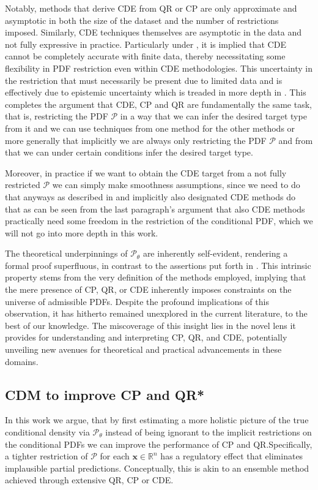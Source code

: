 Notably, methods that derive CDE from QR or CP are only approximate and asymptotic in both the size of the dataset and the number of restrictions imposed. Similarly, CDE techniques themselves are asymptotic in the data and not fully expressive in practice. Particularly under , it is implied that CDE cannot be completely accurate with finite data, thereby necessitating some flexibility in PDF restriction even within CDE methodologies. This uncertainty in the restriction that must necessarily be present due to limited data and  is effectively due to epistemic uncertainty which is treaded in more depth in . This completes the argument that CDE, CP and QR are fundamentally the same task, that is, restricting the PDF $\mathcal{P}$ in a way that we can infer the desired target type from it and we can use techniques from one method for the other methods or more generally that implicitly we are always only restricting the PDF $\mathcal{P}$ and from that we can under certain conditions infer the desired target type.

Moreover, in practice if we want to obtain the CDE target from a not fully restricted $\mathcal{P}$ we can simply make smoothness assumptions, since we need to do that anyways as described in  and implicitly also designated CDE methods do that as can be seen from the last paragraph's argument that also CDE methods practically need some freedom in the restriction of the conditional PDF, which we will not go into more depth in this work.

The theoretical underpinnings of $\mathscr{P}_\theta$ are inherently self-evident, rendering a formal proof superfluous, in contrast to the assertions put forth in . This intrinsic property stems from the very definition of the methods employed, implying that the mere presence of CP, QR, or CDE inherently imposes constraints on the universe of admissible PDFs. Despite the profound implications of this observation, it has hitherto remained unexplored in the current literature, to the best of our knowledge. The miscoverage of this insight lies in the novel lens it provides for understanding and interpreting CP, QR, and CDE, potentially unveiling new avenues for theoretical and practical advancements in these domains.

\subsection{CDM to improve CP and QR*}
In this work we argue, that by first estimating a more holistic picture of the true conditional density via $\mathscr{P}_\theta$ instead of being ignorant to the implicit restrictions on the conditional PDFs we can improve the performance of CP and QR.\@ Specifically, a tighter restriction of $\mathcal{P}$ for each $\mathbf{x}\in\mathbb{R}^n$ has a regulatory effect that eliminates implausible partial predictions. Conceptually, this is akin to an ensemble method achieved through extensive QR, CP or CDE.\@

